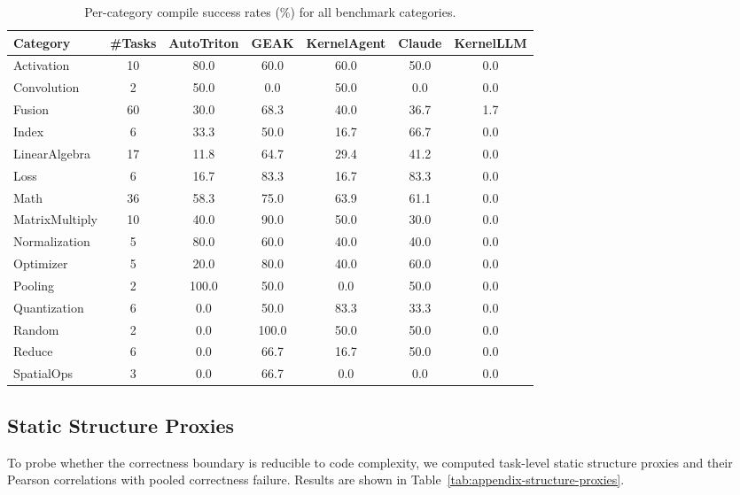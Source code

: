 \begin{table}[t]
\centering
\small
\setlength{\tabcolsep}{5pt}
\caption{Per-category compile success rates (\%) for all benchmark categories.}
\begin{tabular}{lcccccc}
\toprule
Category & \#Tasks & AutoTriton & GEAK & KernelAgent & Claude & KernelLLM \\
\midrule
Activation     & 10 & 80.0  & 60.0  & 60.0  & 50.0  & 0.0 \\
Convolution    & 2  & 50.0  & 0.0   & 50.0  & 0.0   & 0.0 \\
Fusion         & 60 & 30.0  & 68.3  & 40.0  & 36.7  & 1.7 \\
Index          & 6  & 33.3  & 50.0  & 16.7  & 66.7  & 0.0 \\
LinearAlgebra  & 17 & 11.8  & 64.7  & 29.4  & 41.2  & 0.0 \\
Loss           & 6  & 16.7  & 83.3  & 16.7  & 83.3  & 0.0 \\
Math           & 36 & 58.3  & 75.0  & 63.9  & 61.1  & 0.0 \\
MatrixMultiply & 10 & 40.0  & 90.0  & 50.0  & 30.0  & 0.0 \\
Normalization  & 5  & 80.0  & 60.0  & 40.0  & 40.0  & 0.0 \\
Optimizer      & 5  & 20.0  & 80.0  & 40.0  & 60.0  & 0.0 \\
Pooling        & 2  & 100.0 & 50.0  & 0.0   & 50.0  & 0.0 \\
Quantization   & 6  & 0.0   & 50.0  & 83.3  & 33.3  & 0.0 \\
Random         & 2  & 0.0   & 100.0 & 50.0  & 50.0  & 0.0 \\
Reduce         & 6  & 0.0   & 66.7  & 16.7  & 50.0  & 0.0 \\
SpatialOps     & 3  & 0.0   & 66.7  & 0.0   & 0.0   & 0.0 \\
\bottomrule
\end{tabular}
\label{tab:appendix-full-category-compile}
\end{table}


\subsection{Static Structure Proxies}

To probe whether the correctness boundary is reducible to code complexity, we computed task-level static structure proxies and their Pearson correlations with pooled correctness failure. Results are shown in Table~\ref{tab:appendix-structure-proxies}.

